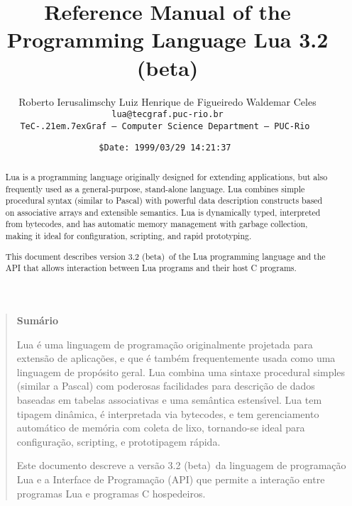 \documentclass[11pt]{article}
\def\tecgraf{{\sf TeC\kern-.21em\lower.7ex\hbox{Graf}}}
\newcommand{\Version}{3.2 (beta)}
\begin{document}
\title{Reference Manual of the Programming Language Lua \Version}

\author{%
Roberto Ierusalimschy\quad
Luiz Henrique de Figueiredo\quad
Waldemar Celes
\vspace{1.0ex}\\
\smallskip
\small\tt lua@tecgraf.puc-rio.br
\vspace{2.0ex}\\
\tecgraf\ --- Computer Science Department --- PUC-Rio
}

\date{{\small \tt\$Date: 1999/03/29 14:21:37 $ $}}

\maketitle

\thispagestyle{empty}
\pagestyle{empty}

\begin{abstract}
\noindent
Lua is a programming language originally designed for extending applications,
but also frequently used as a general-purpose, stand-alone language.
Lua combines simple procedural syntax (similar to Pascal)
with powerful data description constructs based on associative
arrays and extensible semantics.
Lua is dynamically typed, interpreted from bytecodes,
and has automatic memory management with garbage collection,
making it ideal for configuration, scripting, and rapid prototyping. 

This document describes version \Version\ of the Lua programming language
and the API that allows interaction between Lua programs and their
host C programs.
\end{abstract}
\vspace{4ex}
\begin{quotation}
\small
\begin{center}{\bf Sum\'ario}\end{center}
\vspace{1ex}
\noindent
Lua \'e uma linguagem de programa\c{c}\~ao originalmente projetada para
extens\~ao de aplica\c{c}\~oes,
e que \'e tamb\'em frequentemente usada como uma linguagem de
prop\'osito geral.
Lua combina uma sintaxe procedural simples (similar a Pascal)
com poderosas facilidades para descri\c{c}\~ao de dados baseadas
em tabelas associativas e uma sem\^antica estens\'{\i}vel. 
Lua tem tipagem din\^amica, \'e interpretada via bytecodes,
e tem gerenciamento autom\'atico de mem\'oria com coleta de lixo,
tornando-se ideal para configura\c{c}\~ao, scripting,
e prototipagem r\'apida.

Este documento descreve a vers\~ao \Version\ da linguagem de
programa\c{c}\~ao Lua e a Interface de Programa\c{c}\~ao (API) que permite
a intera\c{c}\~ao entre programas Lua e programas C hospedeiros.
\end{quotation}
\end{document}
